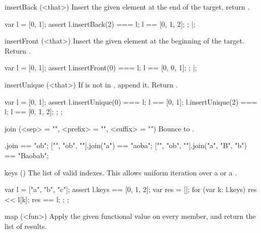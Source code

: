 \begin{urbiscriptapi}
\item[insertBack](<that>)%
  Insert the given element at the end of the target, return \this.

\begin{urbiscript}
{
  var l = [0, 1];
  assert
  {
    l.insertBack(2) === l;
    l == [0, 1, 2];
  };
}|;
\end{urbiscript}

\item[insertFront](<that>)%
  Insert the given element at the beginning of the target.  Return \this.

\begin{urbiscript}
{
  var l = [0, 1];
  assert
  {
    l.insertFront(0) === l;
    l == [0, 0, 1];
  };
}|;
\end{urbiscript}

\item[insertUnique](<that>)%
  If  is not in \this, append it. Return \this.

\begin{urbiscript}
{
  var l = [0, 1];
  assert
  {
    l.insertUnique(0) === l;
    l == [0, 1];
    l.insertUnique(2) === l;
    l == [0, 1, 2];
  };
};
\end{urbiscript}

\item[join](<sep> = "", <prefix> = "", <suffix> = "")%
  Bounce to .

\begin{urbiassert}
["", "ob", ""].join                == "ob";
["", "ob", ""].join("a")           == "aoba";
["", "ob", ""].join("a", "B", "b") == "Baobab";
\end{urbiassert}

\item[keys]()%
  The list of valid indexes.  This allows uniform iteration over a
   or a .

\begin{urbiscript}
{
  var l = ["a", "b", "c"];
  assert
  {
    l.keys == [0, 1, 2];
    {
      var res = [];
      for (var k: l.keys)
        res << l[k];
      res
    }
    == l;
  };
};
\end{urbiscript}

\item[map](<fun>)%
  Apply the given functional value on every member, and return the list of
  results.



\end{urbiscriptapi}

